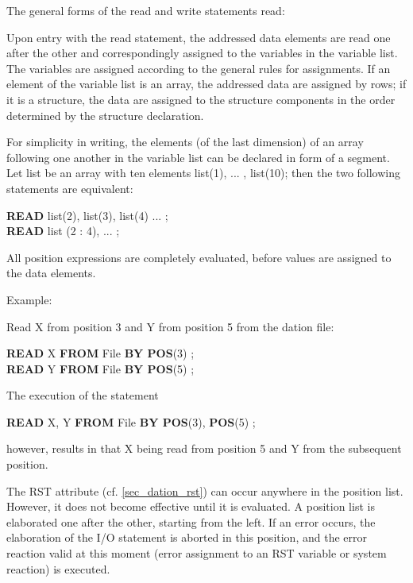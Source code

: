 The general forms of the read and write statements read:










Upon entry with the read statement, the addressed data elements are
read one after the other and correspondingly assigned to the variables
in the variable list. The variables are assigned according to the
general rules for assignments. If an element of the variable list is an
array, the addressed data are assigned by rows; if it is a structure, the
data are assigned to the structure components in the order determined by
the structure declaration.

For simplicity in writing, the elements (of the last dimension) of an
array following one another in the variable list can be declared in form
of a segment. Let list be an array with ten elements list(1), ... ,
list(10); then the two following statements are equivalent:

{\bf READ} list(2), list(3), list(4) ... ;\\
{\bf READ} list (2 : 4), ... ;

All position expressions are completely evaluated, before values are
assigned to the data elements.

Example:

Read X from position 3 and Y from position 5 from the dation file:

{\bf READ} X {\bf FROM} File {\bf BY POS}(3) ;\\
{\bf READ} Y {\bf FROM} File {\bf BY POS}(5) ;

The execution of the statement

{\bf READ} X, Y {\bf FROM} File {\bf BY POS}(3), {\bf POS}(5) ;

however, results in that X being read from position 5 and Y from the
subsequent position.

The RST attribute (cf. \ref{sec_dation_rst}) can occur anywhere in the
 position list.
However, it does not become effective until it is evaluated. A position
list is elaborated one after the other, starting from the left. If an
error occurs, the elaboration of the I/O statement is aborted in this
position, and the error reaction valid at this moment (error assignment
to an RST variable or system reaction) is executed.

